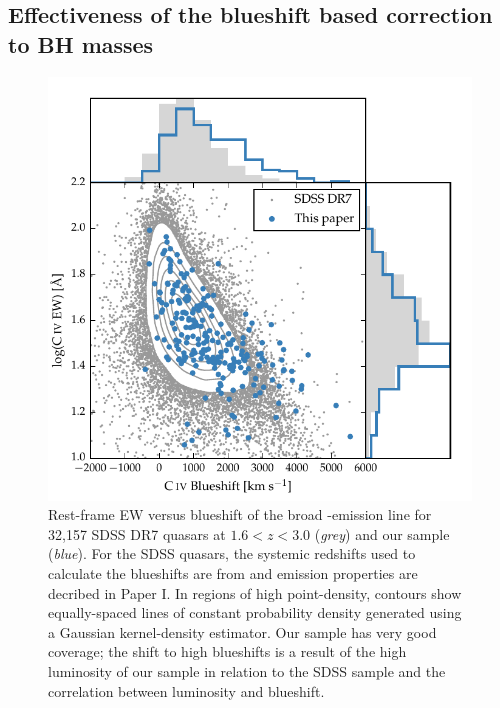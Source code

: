 \subsection{Effectiveness of the  blueshift based correction to BH masses}
\label{sec:effectiveness}

\begin{figure}
    \includegraphics[width=\columnwidth]{figures/chapter03/civ_space.pdf} 
    \caption[{Rest-frame EW versus blueshift of the broad -emission line for 32,157 SDSS DR7 quasars at $1.6 < z < 3.0$ and our sample.}]{Rest-frame EW versus blueshift of the broad -emission line for 32,157 SDSS DR7 quasars at $1.6 < z < 3.0$ ({\it grey}) and our sample ({\it blue}). For the SDSS quasars, the systemic redshifts used to calculate the blueshifts are from \citet{hewett10} and  emission properties are decribed in Paper I. In regions of high point-density, contours show equally-spaced lines of constant probability density generated using a Gaussian kernel-density estimator. Our sample has very good coverage; the shift to high blueshifts is a result of the high luminosity of our sample in relation to the SDSS sample and the correlation between luminosity and blueshift.} 
    \label{fig:civ_space}
\end{figure}

